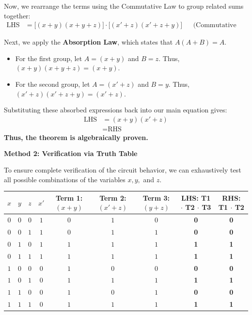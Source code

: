 \documentclass[12pt,a3paper]{article}
\begin{document}
\begin{enumerate}
\begin{tcolorbox}[enhanced,breakable,ansbox,colback=cA!4,colframe=cA,boxrule=0.8pt,arc=5pt,title={\textbf{Answer}},fonttitle=\bfseries\color{white},colbacktitle=cA]
Now, we rearrange the terms using the Commutative Law to group related sums together:
\begin{align*}
\text{LHS} &= \big[ (x + y)(x + y + z) \big] \cdot \big[ (x' + z)(x' + z + y) \big] && \text{(Commutative Law)} 
\end{align*}

Next, we apply the \textbf{Absorption Law}, which states that $A(A + B) = A$. 
\begin{itemize}
    \item For the first group, let $A = (x + y)$ and $B = z$. Thus, $(x + y)(x + y + z) = (x + y)$.
    \item For the second group, let $A = (x' + z)$ and $B = y$. Thus, $(x' + z)(x' + z + y) = (x' + z)$.
\end{itemize}

Substituting these absorbed expressions back into our main equation gives:
\begin{align*}
\text{LHS} &= (x + y)(x' + z) \\
&= \text{RHS}
\end{align*}
\textbf{Thus, the theorem is algebraically proven.}

\vspace{0.6cm}
\textbf{Method 2: Verification via Truth Table}

To ensure complete verification of the circuit behavior, we can exhaustively test all possible combinations of the variables $x, y,$ and $z$. 

\begin{center}
\renewcommand{\arraystretch}{1.3}
\begin{tabular}{|c|c|c||c|c|c|c||c|c|}
\hline
\textbf{$x$} & \textbf{$y$} & \textbf{$z$} & \textbf{$x'$} & \textbf{Term 1:} $(x+y)$ & \textbf{Term 2:} $(x'+z)$ & \textbf{Term 3:} $(y+z)$ & \textbf{LHS:} T1 $\cdot$ T2 $\cdot$ T3 & \textbf{RHS:} T1 $\cdot$ T2 \\
\hline
$0$ & $0$ & $0$ & $1$ & $0$ & $1$ & $0$ & \textbf{0} & \textbf{0} \\
\hline
$0$ & $0$ & $1$ & $1$ & $0$ & $1$ & $1$ & \textbf{0} & \textbf{0} \\
\hline
$0$ & $1$ & $0$ & $1$ & $1$ & $1$ & $1$ & \textbf{1} & \textbf{1} \\
\hline
$0$ & $1$ & $1$ & $1$ & $1$ & $1$ & $1$ & \textbf{1} & \textbf{1} \\
\hline
$1$ & $0$ & $0$ & $0$ & $1$ & $0$ & $0$ & \textbf{0} & \textbf{0} \\
\hline
$1$ & $0$ & $1$ & $0$ & $1$ & $1$ & $1$ & \textbf{1} & \textbf{1} \\
\hline
$1$ & $1$ & $0$ & $0$ & $1$ & $0$ & $1$ & \textbf{0} & \textbf{0} \\
\hline
$1$ & $1$ & $1$ & $0$ & $1$ & $1$ & $1$ & \textbf{1} & \textbf{1} \\
\hline
\end{tabular}
\end{center}


\end{tcolorbox}
\end{enumerate}
\end{document}
